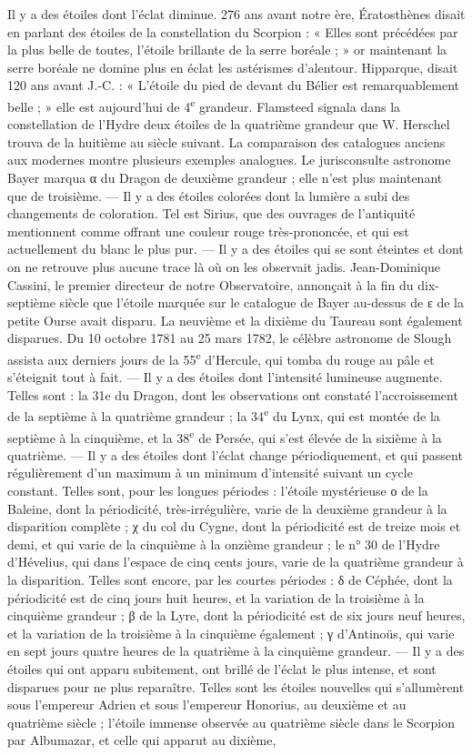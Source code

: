 \documentclass[a4paper, 11pt, oneside, landscape]{article}
\begin{document}
Il y a des étoiles dont l'éclat diminue. 276 ans avant notre ère, Ératosthènes disait en parlant des étoiles de la constellation du Scorpion : « Elles sont précédées par la plus belle de toutes, l'étoile brillante de la serre boréale ; » or maintenant la serre boréale ne domine plus en éclat les astérismes d'alentour. Hipparque, disait 120 ans avant J.-C. : « L'étoile du pied de devant du Bélier est remarquablement belle ; » elle est aujourd'hui de 4\textsuperscript{e} grandeur. Flamsteed signala dans la constellation de l'Hydre deux étoiles de la quatrième grandeur que W. Herschel trouva de la huitième au siècle suivant. La comparaison des catalogues anciens aux modernes montre plusieurs exemples analogues. Le jurisconsulte astronome Bayer marqua α du Dragon de deuxième grandeur ; elle n'est plus maintenant que de troisième. --- Il y a des étoiles colorées dont la lumière a subi des changements de coloration. Tel est Sirius, que des ouvrages de l'antiquité mentionnent comme offrant une couleur rouge très-prononcée, et qui est actuellement du blanc le plus pur. --- Il y a des étoiles qui se sont éteintes et dont on ne retrouve plus aucune trace là où on les observait jadis. Jean-Dominique Cassini, le premier directeur de notre Observatoire, annonçait à la fin du dix-septième siècle que l'étoile marquée sur le catalogue de Bayer au-dessus de ε de la petite Ourse avait disparu. La neuvième et la dixième du Taureau sont également disparues. Du 10 octobre 1781 au 25 mars 1782, le célèbre astronome de Slough assista aux derniers jours de la 55\textsuperscript{e} d'Hercule, qui tomba du rouge au pâle et s'éteignit tout à fait. --- Il y a des étoiles dont l'intensité lumineuse augmente. Telles sont : la 31e du Dragon, dont les observations ont constaté l'accroissement de la septième à la quatrième grandeur ; la 34\textsuperscript{e} du Lynx, qui est montée de la septième à la cinquième, et la 38\textsuperscript{e} de Persée, qui s'est élevée de la sixième à la quatrième. --- Il y a des étoiles dont l'éclat change périodiquement, et qui passent régulièrement d'un maximum à un minimum d'intensité suivant un cycle constant. Telles sont, pour les longues périodes : l'étoile mystérieuse ο de la Baleine, dont la périodicité, très-irrégulière, varie de la deuxième grandeur à la disparition complète ; χ du col du Cygne, dont la périodicité est de treize mois et demi, et qui varie de la cinquième à la onzième grandeur ; le n° 30 de l'Hydre d'Hévelius, qui dans l'espace de cinq cents jours, varie de la quatrième grandeur à la disparition. Telles sont encore, par les courtes périodes : δ de Céphée, dont la périodicité est de cinq jours huit heures, et la variation de la troisième à la cinquième grandeur ; β de la Lyre, dont la périodicité est de six jours neuf heures, et la variation de la troisième à la cinquième également ; γ d'Antinoüs, qui varie en sept jours quatre heures de la quatrième à la cinquième grandeur. --- Il y a des étoiles qui ont apparu subitement, ont brillé de l'éclat le plus intense, et sont disparues pour ne plus reparaître. Telles sont les étoiles nouvelles qui s'allumèrent sous l'empereur Adrien et sous l'empereur Honorius, au deuxième et au quatrième siècle ; l'étoile immense observée au quatrième siècle dans le Scorpion par Albumazar, et celle qui apparut au dixième, 
\end{document}

